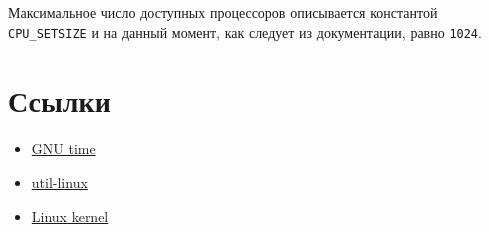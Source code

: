 \documentclass[12pt,a4paper]{article}
\begin{document}
Максимальное число доступных процессоров описывается константой \texttt{CPU\_SETSIZE} и на данный момент, как следует 
из документации, равно \texttt{1024}.

\section*{Ссылки}

\begin{itemize}
	\item \href{https://www.gnu.org/software/time/}{GNU time}
	\item \href{https://www.kernel.org/pub/linux/utils/util-linux/}{util-linux}
	\item \href{https://mirrors.edge.kernel.org/pub/linux/kernel/v4.x/}{Linux kernel}
\end{itemize}
\end{document}
